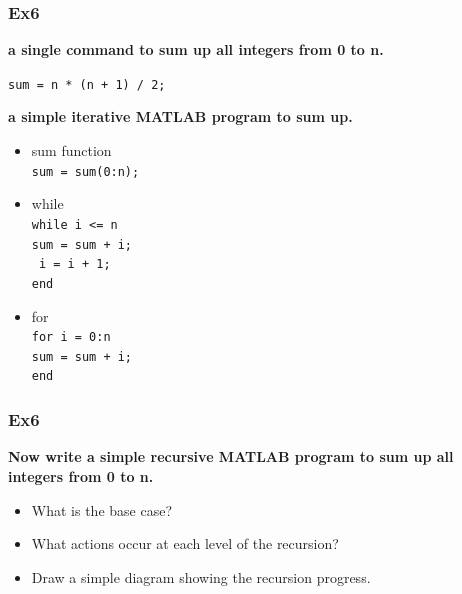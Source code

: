 \documentclass[
	11pt, %
]{beamer}
\begin{document}
\begin{frame}
	\frametitle{Ex6}

	\textbf{ a single command to sum up all integers from 0 to n.}

    \texttt{sum = n * (n + 1) / 2;}
    
    \textbf{a simple iterative MATLAB program to sum up.}
    \begin{itemize}
        \item sum function \\ \texttt{sum = sum(0:n);}
        \item while \\ \texttt{while i <= n} \\ \quad \texttt{sum = sum + i; }\\\quad \texttt{ i = i + 1;}\\\texttt{end}
        \item for \\ \texttt{for i = 0:n} \\\quad \texttt{sum = sum + i; }\\\texttt{end}
    \end{itemize}

\end{frame}


\begin{frame}
	\frametitle{Ex6}
   \textbf{Now write a simple recursive MATLAB program to sum up all integers from 0 to n.}
   \begin{itemize}
    \item What is the base case?
    \\
    \item What actions occur at each level of the recursion?
    \\
    \item Draw a simple diagram showing the recursion progress.
   \end{itemize}

\end{frame}

\end{document}
